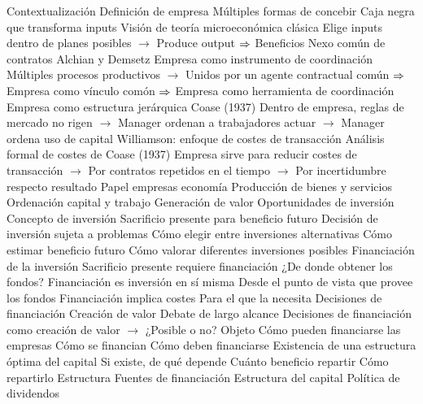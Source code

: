 \documentclass{nuevotema}
\begin{document}
\begin{esquema}[enumerate]
\end{esquema}

\esquemalargo

\begin{esquemal}
	\1[] 
		\2 Contextualización
			\3 Definición de empresa
				\4 Múltiples formas de concebir
				\4 Caja negra que transforma inputs
				\4[] Visión de teoría microeconómica clásica
				\4[] Elige inputs dentro de planes posibles
				\4[] $\to$ Produce output
				\4[] $\Rightarrow$ Beneficios
				\4 Nexo común de contratos
				\4[] Alchian y Demsetz
				\4[] Empresa como instrumento de coordinación
				\4[] Múltiples procesos productivos
				\4[] $\to$ Unidos por un agente contractual común
				\4[] $\Rightarrow$ Empresa como vínculo comón
				\4[] $\Rightarrow$ Empresa como herramienta de coordinación
				\4 Empresa como estructura jerárquica
				\4[] Coase (1937)
				\4[] Dentro de empresa, reglas de mercado no rigen
				\4[] $\to$ Manager ordenan a trabajadores actuar
				\4[] $\to$ Manager ordena uso de capital
				\4 Williamson: enfoque de costes de transacción
				\4[] Análisis formal de costes de Coase (1937)
				\4[] Empresa sirve para reducir costes de transacción
				\4[] $\to$ Por contratos repetidos en el tiempo
				\4[] $\to$ Por incertidumbre respecto resultado
			\3 Papel empresas economía
				\4 Producción de bienes y servicios
				\4 Ordenación capital y trabajo
				\4 Generación de valor
				\4 Oportunidades de inversión
			\3 Concepto de inversión
				\4 Sacrificio presente para beneficio futuro
				\4 Decisión de inversión sujeta a problemas
				\4[] Cómo elegir entre inversiones alternativas
				\4[] Cómo estimar beneficio futuro
				\4[] Cómo valorar diferentes inversiones posibles
			\3 Financiación de la inversión
				\4 Sacrificio presente requiere financiación
				\4[] ¿De donde obtener los fondos?
				\4 Financiación es inversión en sí misma
				\4[] Desde el punto de vista que provee los fondos
				\4 Financiación implica costes
				\4[] Para el que la necesita
				\4 Decisiones de financiación
				\4 Creación de valor
				\4[] Debate de largo alcance
				\4[] Decisiones de financiación como creación de valor
				\4[] $\to$ ¿Posible o no?
		\2 Objeto
			\3 Cómo pueden financiarse las empresas
			\3 Cómo se financian
			\3 Cómo deben financiarse
			\3 Existencia de una estructura óptima del capital
				\4 Si existe, de qué depende
			\3 Cuánto beneficio repartir
			\3 Cómo repartirlo
		\2 Estructura
			\3 Fuentes de financiación
			\3 Estructura del capital
			\3 Política de dividendos
	\1 

\end{esquemal}
\end{document}
